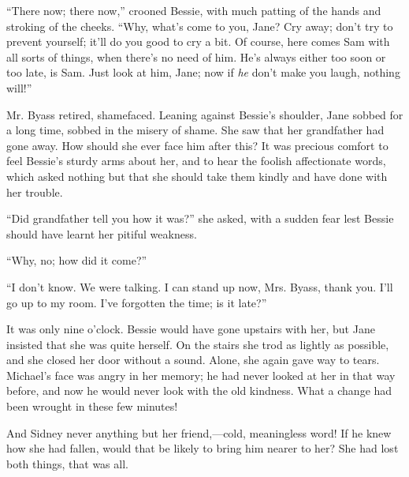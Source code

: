 ``There now; there now,'' crooned Bessie, with much patting of the hands
and stroking of the cheeks. ``Why, what's come to you, Jane? Cry away;
don't try to prevent yourself; it'll do you good to cry a bit. Of
course, here comes Sam with all sorts of things, when there's no need of
him. He's always either too soon or too late, is Sam. Just look at him,
Jane; now if \emph{he} don't make you laugh, nothing will!''

Mr. Byass retired, shamefaced. Leaning against Bessie's shoulder, Jane
sobbed for a long time, sobbed in the misery of shame. She saw that her
grandfather had gone away. How should she ever face him after this? It
was precious comfort to feel Bessie's sturdy arms about her, and to hear
the foolish affectionate words, which asked nothing but that {}she
should take them kindly and have done with her trouble.

``Did grandfather tell you how it was?'' she asked, with a sudden fear
lest Bessie should have learnt her pitiful weakness.

``Why, no; how did it come?''

``I don't know. We were talking. I can stand up now, Mrs. Byass, thank
you. I'll go up to my room. I've forgotten the time; is it late?''

It was only nine o'clock. Bessie would have gone upstairs with her, but
Jane insisted that she was quite herself. On the stairs she trod as
lightly as possible, and she closed her door without a sound. Alone, she
again gave way to tears. Michael's face was angry in her memory; he had
never looked at her in that way before, and now he would never look with
the old kindness. What a change had been wrought in these few minutes!

And Sidney never anything but her friend,---cold, meaningless word! If
he knew how she had fallen, would that be likely to bring him nearer to
her? She had lost both things, that was all.
